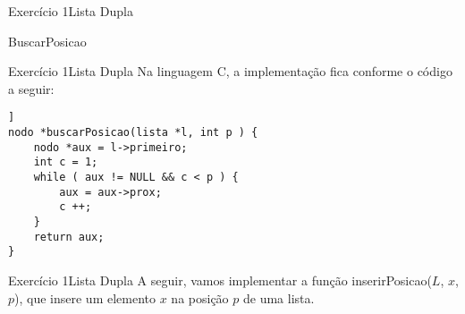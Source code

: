 \documentclass[aspectratio=169]{beamer}
\begin{document}
\begin{frame}[fragile]{Exercício 1}{Lista Dupla}
\begin{algorithm}[H]
\caption{BuscarPosicao} 
\label{ListaDuplaBuscar}
\end{algorithm}
\end{frame}


\begin{frame}[fragile]{Exercício 1}{Lista Dupla}
Na linguagem C, a implementação fica conforme o código a seguir:
\begin{lstlisting}[style=CStyle]]
nodo *buscarPosicao(lista *l, int p ) {
    nodo *aux = l->primeiro;
    int c = 1;
    while ( aux != NULL && c < p ) {
        aux = aux->prox;
        c ++;
    }
    return aux;
}
\end{lstlisting}  
\end{frame}


\begin{frame}[fragile]{Exercício 1}{Lista Dupla}
A seguir, vamos implementar a função inserirPosicao($L$, $x$, $p$), que insere um elemento $x$ na posição $p$ de uma lista.
\end{frame}

\end{document}
